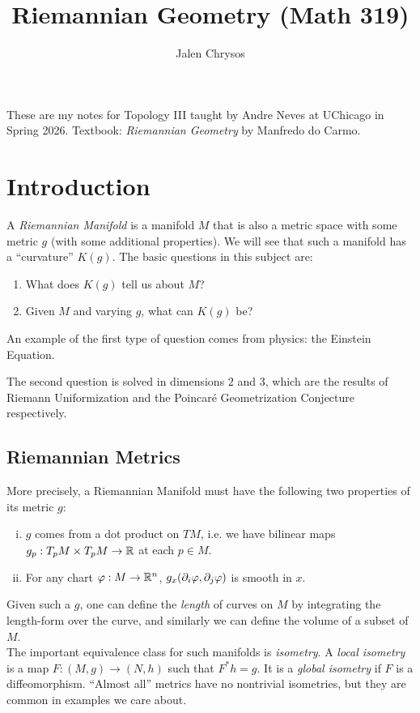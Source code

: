 \documentclass{amsart}
\title{Riemannian Geometry (Math 319)}
\author{Jalen Chrysos}
\begin{document}
	
	\maketitle
	
	These are my notes for Topology III taught by Andre Neves at UChicago in Spring 2026. Textbook: \textit{Riemannian Geometry} by Manfredo do Carmo.
	
	\tableofcontents
	
	\newpage 
	\section{Introduction}
	A \textit{Riemannian Manifold} is a manifold $M$ that is also a metric space with some metric $g$ (with some additional properties). We will see that such a manifold has a ``curvature'' $K(g)$. The basic questions in this subject are:
	\begin{enumerate}[(1)]
		\item What does $K(g)$ tell us about $M$?
		\item Given $M$ and varying $g$, what can $K(g)$ be?
	\end{enumerate}
	
	An example of the first type of question comes from physics: the Einstein Equation.
	
	The second question is solved in dimensions $2$ and $3$, which are the results of Riemann Uniformization and the Poincar\'e Geometrization Conjecture respectively.
	
	\subsection{Riemannian Metrics} More precisely, a Riemannian Manifold must have the following two properties of its metric $g$:
	\begin{enumerate}[(i)]
		\item $g$ comes from a dot product on $TM$, i.e. we have bilinear maps $g_p:T_pM\times T_pM\to \mathbb{R}$ at each $p\in M$.
		\item For any chart $\varphi:M\to \mathbb{R}^n$, $g_x(\partial_i \varphi,\partial_j \varphi)$ is smooth in $x$.
	\end{enumerate}
	
	Given such a $g$, one can define the \textit{length} of curves on $M$ by integrating the length-form over the curve, and similarly we can define the volume of a subset of $M$.\\
	
	The important equivalence class for such manifolds is \textit{isometry}. A \textit{local isometry} is a map $F:(M,g)\to (N,h)$ such that $F^*h=g$. It is a \textit{global isometry} if $F$ is a diffeomorphism. ``Almost all'' metrics have no nontrivial isometries, but they are common in examples we care about.\\
	
\end{document}

